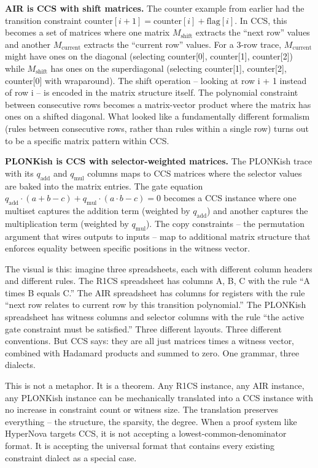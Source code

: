 \documentclass[
  11pt,
  openany]{report}
\renewcommand{\textbf}[1]{{\bfseries\color{MidnightBold}#1}}
\begin{document}
\textbf{AIR is CCS with shift matrices.} The counter example from earlier had
the transition constraint
\(\text{counter}[i+1] = \text{counter}[i] + \text{flag}[i]\). In CCS, this
becomes a set of matrices where one matrix \(M_{\text{shift}}\) extracts the
``next row'' values and another \(M_{\text{current}}\) extracts the ``current
row'' values. For a 3-row trace, \(M_{\text{current}}\) might have ones on the
diagonal (selecting counter{[}0{]}, counter{[}1{]}, counter{[}2{]}) while
\(M_{\text{shift}}\) has ones on the superdiagonal (selecting counter{[}1{]},
counter{[}2{]}, counter{[}0{]} with wraparound). The shift operation -- looking
at row i + 1 instead of row i -- is encoded in the matrix structure itself. The
polynomial constraint between consecutive rows becomes a matrix-vector product
where the matrix has ones on a shifted diagonal. What looked like a
fundamentally different formalism (rules between consecutive rows, rather than
rules within a single row) turns out to be a specific matrix pattern within CCS.

\textbf{PLONKish is CCS with selector-weighted matrices.} The PLONKish trace
with its \(q_{\text{add}}\) and \(q_{\text{mul}}\) columns maps to CCS matrices
where the selector values are baked into the matrix entries. The gate equation
\(q_{\text{add}} \cdot (a + b - c) + q_{\text{mul}} \cdot (a \cdot b - c) = 0\)
becomes a CCS instance where one multiset captures the addition term (weighted
by \(q_{\text{add}}\)) and another captures the multiplication term (weighted by
\(q_{\text{mul}}\)). The copy constraints -- the permutation argument that wires
outputs to inputs -- map to additional matrix structure that enforces equality
between specific positions in the witness vector.

The visual is this: imagine three spreadsheets, each with different column
headers and different rules. The R1CS spreadsheet has columns A, B, C with the
rule ``A times B equals C.'' The AIR spreadsheet has columns for registers with
the rule ``next row relates to current row by this transition polynomial.'' The
PLONKish spreadsheet has witness columns and selector columns with the rule
``the active gate constraint must be satisfied.'' Three different layouts. Three
different conventions. But CCS says: they are all just matrices times a witness
vector, combined with Hadamard products and summed to zero. One grammar, three
dialects.

This is not a metaphor. It is a theorem. Any R1CS instance, any AIR instance,
any PLONKish instance can be mechanically translated into a CCS instance with no
increase in constraint count or witness size. The translation preserves
everything -- the structure, the sparsity, the degree. When a proof system like
HyperNova targets CCS, it is not accepting a lowest-common-denominator format.
It is accepting the universal format that contains every existing constraint
dialect as a special case.
\end{document}
